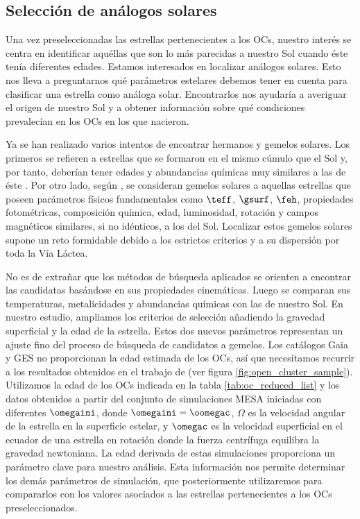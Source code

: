 \subsection{Selección de análogos solares} \label{sec:gemelos_solares}
Una vez preseleccionadas las estrellas pertenecientes a los OCs, nuestro interés se centra en identificar aquéllas que son lo más parecidas a nuestro Sol cuando éste tenía diferentes edades. Estamos interesados en localizar análogos solares. Esto nos lleva a preguntarnos qué parámetros estelares debemos tener en cuenta para clasificar una estrella como análoga solar. Encontrarlos nos ayudaría a averiguar el origen de nuestro Sol y a obtener información sobre qué condiciones prevalecían en los OCs en los que nacieron.\par

Ya se han realizado varios intentos de encontrar hermanos y gemelos solares. Los primeros se refieren a estrellas que se formaron en el mismo cúmulo que el Sol y, por tanto, deberían tener edades y abundancias químicas muy similares a las de éste \citep[ver][y referencias en él]{Adibekyan2018}. Por otro lado, según \cite{Strobel1996}, se consideran gemelos solares a aquellas estrellas que poseen parámetros físicos fundamentales como $\teff$, $\gsurf$, $\feh$, propiedades fotométricas, composición química, edad, luminosidad, rotación y campos magnéticos similares, si no idénticos, a los del Sol. Localizar estos gemelos solares supone un reto formidable debido a los estrictos criterios y a su dispersión por toda la Vía Láctea.\par 

No es de extrañar que los métodos de búsqueda aplicados se orienten a encontrar las candidatas basándose en sus propiedades cinemáticas. Luego se comparan sus temperaturas, metalicidades y abundancias químicas con las de nuestro Sol. En nuestro estudio, ampliamos los criterios de selección añadiendo la gravedad superficial y la edad de la estrella. Estos dos nuevos parámetros representan un ajuste fino del proceso de búsqueda de candidatos a gemelos. Los catálogos Gaia y GES no proporcionan la edad estimada de los OCs, así que necesitamos recurrir a los resultados obtenidos en el trabajo de \cite{Bragaglia2022} (ver figura \ref{fig:open_cluster_sample}). Utilizamos la edad de los OCs indicada en la tabla \ref{tab:oc_reduced_list} y los datos obtenidos a partir del conjunto de simulaciones MESA iniciadas con diferentes $\omegaini$, donde $\omegaini = \oomegac$, $\Omega$ es la velocidad angular de la estrella en la superficie estelar, y $\omegac$ es la velocidad superficial en el ecuador de una estrella en rotación donde la fuerza centrífuga equilibra la gravedad newtoniana. La edad derivada de estas simulaciones proporciona un parámetro clave para nuestro análisis. Esta información nos permite determinar los demás parámetros de simulación, que posteriormente utilizaremos para compararlos con los valores asociados a las estrellas pertenecientes a los OCs preseleccionados.\par

